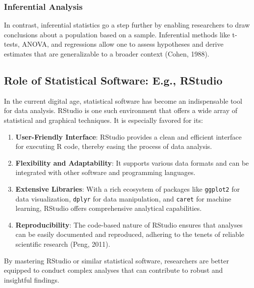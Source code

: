 \documentclass[
  b5paper]{book}
\providecommand{\tightlist}{%
  \setlength{\itemsep}{0pt}\setlength{\parskip}{0pt}}
\begin{document}
\hypertarget{inferential-analysis}{%
\subsubsection{Inferential Analysis}\label{inferential-analysis}}

In contrast, inferential statistics go a step further by enabling researchers to draw conclusions about a population based on a sample. Inferential methods like t-tests, ANOVA, and regressions allow one to assess hypotheses and derive estimates that are generalizable to a broader context (Cohen, 1988).

\hypertarget{role-of-statistical-software-e.g.-rstudio}{%
\subsection{Role of Statistical Software: E.g., RStudio}\label{role-of-statistical-software-e.g.-rstudio}}

In the current digital age, statistical software has become an indispensable tool for data analysis. RStudio is one such environment that offers a wide array of statistical and graphical techniques. It is especially favored for its:

\begin{enumerate}
\def\labelenumi{\arabic{enumi}.}
\tightlist
\item
  \textbf{User-Friendly Interface}: RStudio provides a clean and efficient interface for executing R code, thereby easing the process of data analysis.
\item
  \textbf{Flexibility and Adaptability}: It supports various data formats and can be integrated with other software and programming languages.
\item
  \textbf{Extensive Libraries}: With a rich ecosystem of packages like \texttt{ggplot2} for data visualization, \texttt{dplyr} for data manipulation, and \texttt{caret} for machine learning, RStudio offers comprehensive analytical capabilities.
\item
  \textbf{Reproducibility}: The code-based nature of RStudio ensures that analyses can be easily documented and reproduced, adhering to the tenets of reliable scientific research (Peng, 2011).
\end{enumerate}

By mastering RStudio or similar statistical software, researchers are better equipped to conduct complex analyses that can contribute to robust and insightful findings.
\end{document}
